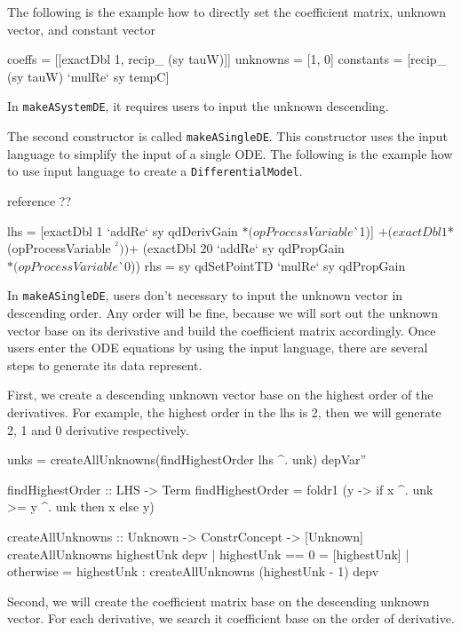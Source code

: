 The following is the example how to directly set the coefficient matrix, unknown vector, and constant vector

\begin{haskell1}
coeffs = [[exactDbl 1, recip_ (sy tauW)]]
unknowns = [1, 0]
constants = [recip_ (sy tauW) `mulRe` sy tempC]
\end{haskell1}

In \verb|makeASystemDE|, it requires users to input the unknown descending.

The second constructor is called \verb|makeASingleDE|. This constructor uses the input language to simplify the input of a single ODE. The following is the example how to use input language to create a \verb|DifferentialModel|.

reference ??
\begin{haskell1}
lhs = [exactDbl 1 `addRe` sy qdDerivGain $* (opProcessVariable $^^ 1)]
 $+ (exactDbl 1 $* (opProcessVariable $^^ 2))
 $+ (exactDbl 20 `addRe` sy qdPropGain $* (opProcessVariable $^^ 0))
rhs = sy qdSetPointTD `mulRe` sy qdPropGain
\end{haskell1}

In \verb|makeASingleDE|, users don't necessary to input the unknown vector in descending order. Any order will be fine, because we will sort out the unknown vector base on its derivative and build the coefficient matrix accordingly. Once users enter the ODE equations by using the input language, there are several steps to generate its data represent.

First, we create a descending unknown vector base on the highest order of the derivatives. For example, the highest order in the lhs is 2, then we will generate 2, 1 and 0 derivative respectively.

\begin{haskell1}
unks = createAllUnknowns(findHighestOrder lhs ^. unk) depVar''

findHighestOrder :: LHS -> Term
findHighestOrder = foldr1 (\x y -> if x ^. unk >= y ^. unk then x else y)

createAllUnknowns :: Unknown -> ConstrConcept -> [Unknown]
createAllUnknowns highestUnk depv
| highestUnk  == 0  = [highestUnk]
| otherwise = highestUnk : createAllUnknowns (highestUnk - 1) depv
\end{haskell1}

Second, we will create the coefficient matrix base on the descending unknown vector. For each derivative, we search it coefficient base on the order of derivative.

